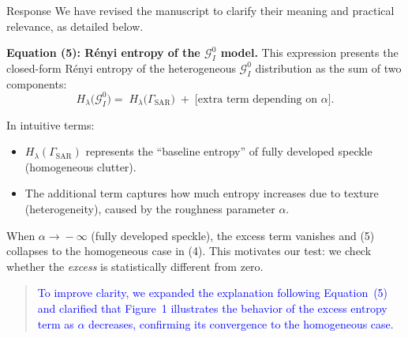 \documentclass[11pt]{report}
\begin{document}
\begin{responsebox}{Response}
 We have revised the manuscript to clarify their meaning and practical relevance, as detailed below.

\vspace{0.5em}

\textbf{Equation (5): Rényi entropy of the $\mathcal{G}^{0}_{\!I}$ model.}  
This expression presents the closed-form Rényi entropy of the heterogeneous $\mathcal{G}^{0}_{\!I}$ distribution as the sum of two components:
\[
H_\lambda\bigl(\mathcal{G}^{0}_{\!I}\bigr)
=\;H_\lambda\bigl(\Gamma_{\text{SAR}}\bigr)
\;+\;\bigl[\text{extra\ term depending on }\alpha\bigr].
\]

In intuitive terms:
\begin{itemize}
	\item $H_\lambda(\Gamma_{\text{SAR}})$ represents the “baseline entropy” of fully developed speckle (homogeneous clutter).
	\item The additional term captures how much entropy increases due to texture (heterogeneity), caused by the roughness parameter $\alpha$.
\end{itemize}
When $\alpha\!\to\!-\infty$ (fully developed speckle), the excess term vanishes and (5) collapses to the homogeneous case in (4).  This motivates our test: we check whether the \emph{excess} is statistically different from zero.

\vspace{0.3em}
\begin{quote}

\textcolor{blue}{To improve clarity, we expanded the explanation following Equation~(5) and clarified that Figure~1 illustrates the behavior of the excess entropy term as $\alpha$ decreases, confirming its convergence to the homogeneous case.}

\end{quote}
\end{responsebox}
\end{document}
